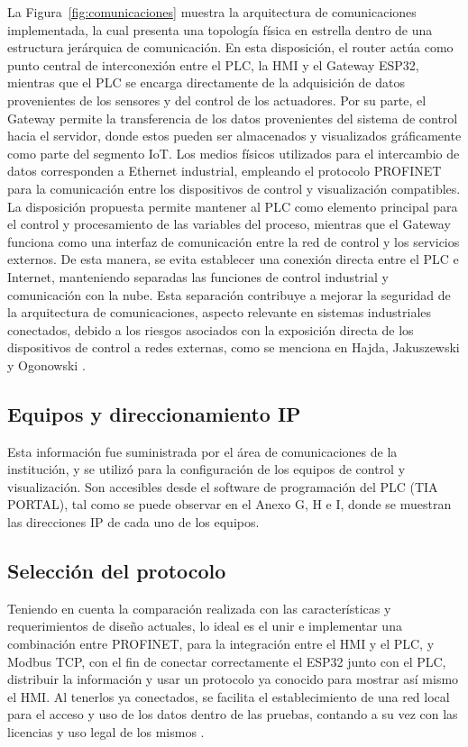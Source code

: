 {La Figura~\ref{fig:comunicaciones} muestra la arquitectura de comunicaciones implementada, la cual presenta una topología física en estrella dentro de una estructura jerárquica de comunicación. En esta disposición, el router actúa como punto central de interconexión entre el PLC, la HMI y el Gateway ESP32, mientras que el PLC se encarga directamente de la adquisición de datos provenientes de los sensores y del control de los actuadores. Por su parte, el Gateway permite la transferencia de los datos provenientes del sistema de control hacia el servidor, donde estos pueden ser almacenados y visualizados gráficamente como parte del segmento IoT. Los medios físicos utilizados para el intercambio de datos corresponden a Ethernet industrial, empleando el protocolo PROFINET para la comunicación entre los dispositivos de control y visualización compatibles. La disposición propuesta permite mantener al PLC como elemento principal para el control y procesamiento de las variables del proceso, mientras que el Gateway funciona como una interfaz de comunicación entre la red de control y los servicios externos. De esta manera, se evita establecer una conexión directa entre el PLC e Internet, manteniendo separadas las funciones de control industrial y comunicación con la nube. Esta separación contribuye a mejorar la seguridad de la arquitectura de comunicaciones, aspecto relevante en sistemas industriales conectados, debido a los riesgos asociados con la exposición directa de los dispositivos de control a redes externas, como se menciona en Hajda, Jakuszewski y Ogonowski \cite{hajda2021security}.

\subsection{Equipos y direccionamiento IP}

{Esta información fue suministrada por el área de comunicaciones de la institución, y se utilizó para la configuración de los equipos de control y visualización. Son accesibles desde el software de programación del PLC (TIA PORTAL), tal como se puede observar en el Anexo G, H e I, donde se muestran las direcciones IP de cada uno de los equipos.}

\subsection{Selección del protocolo}

{Teniendo en cuenta la comparación realizada con las características y requerimientos de diseño actuales, lo ideal es el unir e implementar una combinación entre PROFINET, para la integración entre el HMI y el PLC, y Modbus TCP, con el fin de conectar correctamente el ESP32 junto con el PLC, distribuir la información y usar un protocolo ya conocido para mostrar así mismo el HMI. Al tenerlos ya conectados, se facilita el establecimiento de una red local para el acceso y uso de los datos dentro de las pruebas, contando a su vez con las licencias y uso legal de los mismos \cite{cometa2025modbus}.

}}
